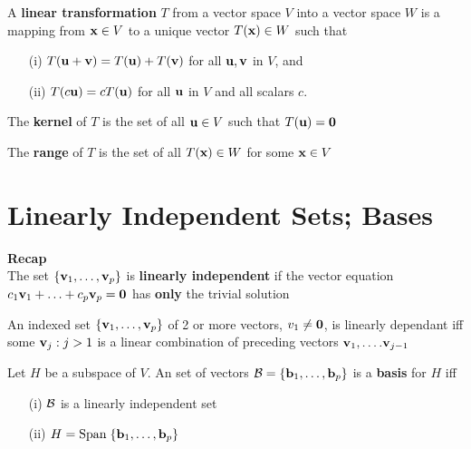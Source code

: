 \documentclass{report}
\begin{document}
\begin{definition}
    A \textbf{linear transformation} $T$ from a vector space $V$ into a vector space
    $W$ is a mapping from $\mathbf{x} \in  V$ to a unique vector $T(\mathbf{x}) \in W$ such that
    \begin{itemize}[]
        \item[(i)] $T(\mathbf{u} + \mathbf{v}) = T(\mathbf{u}) + T(\mathbf{v})$ \quad for all $\mathbf{u}, \mathbf{v}$ in $V$, and
        \item[(ii)] $T(c \mathbf{u}) = c T(\mathbf{u})$ \quad for all $\mathbf{u}$ in $V$ and all scalars $c$.
    \end{itemize}
\end{definition}

\begin{definition}
    The \textbf{kernel} of $T$ is the set of all $\mathbf{u} \in V$ such that $T(\mathbf{u}) = \mathbf{0}$
\end{definition}

\begin{definition}
    The \textbf{range} of $T$ is the set of all $T(\mathbf{x}) \in W$ for some $\mathbf{x} \in V$
\end{definition}

\section{Linearly Independent Sets; Bases}
\textbf{Recap}\\
The set $\{\mathbf{v}_1, \dots, \mathbf{v}_p\}$ is \textbf{linearly independent} if the 
vector equation $c_1 \mathbf{v}_1 + \ldots + c_p \mathbf{v}_p = \mathbf{0} $
has \textbf{only} the trivial solution

\begin{theorem}
    An indexed set $\{\mathbf{v}_1, \dots, \mathbf{v}_p\}$ of 2 or more vectors, $v_1 \ne \mathbf{0}$,
    is linearly dependant iff some $\mathbf{v}_j: j > 1$ is a linear combination of 
    preceding vectors $\mathbf{v}_1, \ldots. \mathbf{v}_{j-1}$
\end{theorem}

\begin{definition}
    Let $H$ be a subspace of $V$.
    An set of vectors $\mathcal{B} = \{\mathbf{b}_1, \dots, \mathbf{b}_p\}$ is a \textbf{basis} for
    $H$ iff
    \begin{enumerate}
        \item[(i)] $\mathcal{B}$ is a linearly independent set
        \item[(ii)] $H = \mathrm{Span}\; \{\mathbf{b}_1, \dots, \mathbf{b}_p\}$
    \end{enumerate}
\end{definition}
\end{document}

